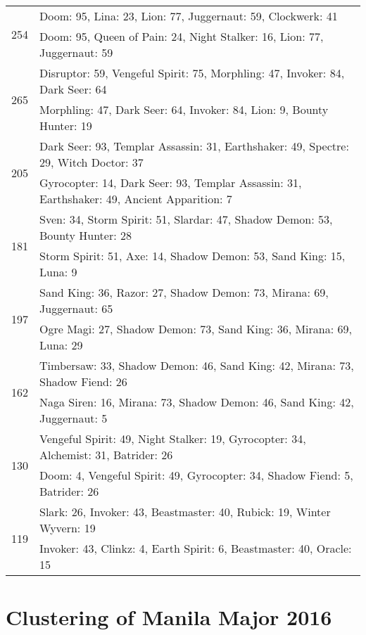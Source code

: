 \documentclass[result.tex]{subfiles}
\begin{document}
\begin{table}[H]
\begin{tabular}{ | c | p{12.5cm} | }
    \hline
    \multirow{2}{*}{254}
    & Doom: 95, Lina: 23, Lion: 77, Juggernaut: 59, Clockwerk: 41 \\
    & Doom: 95, Queen of Pain: 24, Night Stalker: 16, Lion: 77, Juggernaut: 59 \\
    \hline
    \multirow{2}{*}{265}
    & Disruptor: 59, Vengeful Spirit: 75, Morphling: 47, Invoker: 84, Dark Seer: 64 \\
    & Morphling: 47, Dark Seer: 64, Invoker: 84, Lion: 9, Bounty Hunter: 19 \\
    \hline
    \multirow{2}{*}{205}
    & Dark Seer: 93, Templar Assassin: 31, Earthshaker: 49, Spectre: 29, Witch Doctor: 37 \\
    & Gyrocopter: 14, Dark Seer: 93, Templar Assassin: 31, Earthshaker: 49, Ancient Apparition: 7 \\
    \hline
    \multirow{2}{*}{181}
    & Sven: 34, Storm Spirit: 51, Slardar: 47, Shadow Demon: 53, Bounty Hunter: 28 \\
    & Storm Spirit: 51, Axe: 14, Shadow Demon: 53, Sand King: 15, Luna: 9 \\
    \hline
    \multirow{2}{*}{197}
    & Sand King: 36, Razor: 27, Shadow Demon: 73, Mirana: 69, Juggernaut: 65 \\
    & Ogre Magi: 27, Shadow Demon: 73, Sand King: 36, Mirana: 69, Luna: 29 \\
    \hline
    \multirow{2}{*}{162}
    & Timbersaw: 33, Shadow Demon: 46, Sand King: 42, Mirana: 73, Shadow Fiend: 26 \\
    & Naga Siren: 16, Mirana: 73, Shadow Demon: 46, Sand King: 42, Juggernaut: 5 \\
    \hline
    \multirow{2}{*}{130}
    & Vengeful Spirit: 49, Night Stalker: 19, Gyrocopter: 34, Alchemist: 31, Batrider: 26 \\
    & Doom: 4, Vengeful Spirit: 49, Gyrocopter: 34, Shadow Fiend: 5, Batrider: 26 \\
    \hline
    \multirow{2}{*}{119}
    & Slark: 26, Invoker: 43, Beastmaster: 40, Rubick: 19, Winter Wyvern: 19 \\
    & Invoker: 43, Clinkz: 4, Earth Spirit: 6, Beastmaster: 40, Oracle: 15 \\
    \hline
  \end{tabular}
  \caption{}
  \label{}
\end{table}

\clearpage
\section*{Clustering of Manila Major 2016}
\end{document}
